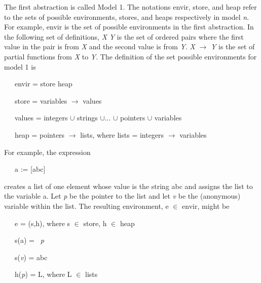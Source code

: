 The first abstraction is called Model 1. The notations
envir\TextSubscript{[}\textit{}\TextSubscript{]},
store\TextSubscript{[}\textit{}\TextSubscript{]}, and
heap\TextSubscript{[}\textit{}\TextSubscript{]} refer
to the sets of possible environments, stores, and heaps respectively
in model \textit{n}. For example, envir\TextSubscript{[1]} is the set
of possible environments in the first abstraction. In the following
set of definitions, \textit{X} {\texttimes} \textit{Y} is the set of
ordered pairs where the first value in the pair is from \textit{X} and
the second value is from \textit{Y}. \textit{X} ${\rightarrow}$
\textit{Y} is the set of partial functions from \textit{X} to
\textit{Y}. The definition of the set possible environments for model
1 is

{\ttfamily\mdseries
\ \ \ envir\TextSubscript{[1]} = store\TextSubscript{[1]} {\texttimes} heap\TextSubscript{[1]}}

{\ttfamily\mdseries
\ \ \ store\TextSubscript{[1]} = variables \textrm{${\rightarrow}$ }values}

{\ttfamily\mdseries
\ \ \ values = integers \textrm{${\cup}$} strings \textrm{${\cup}$}... \textrm{${\cup}$} pointers \textrm{${\cup}$}
variables}

{\ttfamily\mdseries
\ \ \ heap\TextSubscript{[1]} = pointers \textrm{${\rightarrow}$} lists, where lists = integers \textrm{${\rightarrow}$}
variables}


For example, the expression 

{\ttfamily\mdseries
\ \ \ a := [{\textquotedbl}abc{\textquotedbl}]}

\noindent creates a list of one element whose value is the string abc
and assigns the list to the variable a. Let
\textit{p}\textit{} be the pointer to the list and
let \textit{v}\textit{} be the (anonymous) variable
within the list. The resulting environment, e ${\in}$
envir\TextSubscript{[1]}, might be

{\ttfamily\mdseries
\ \ \ e = (s,h), where s \textrm{${\in}$} store\TextSubscript{[1]}, h \textrm{${\in}$} heap\TextSubscript{[1]}}

{\ttfamily\mdseries
\ \ \ s(a) = \ \textit{p}\textit{}}

{\ttfamily\mdseries
\ \ \ s(\textit{v}\textit{}) = {\textquotedbl}abc{\textquotedbl}}

{\ttfamily\mdseries
\ \ \ h(\textit{p}\textit{}) = L, where L \textrm{${\in}$} lists}

